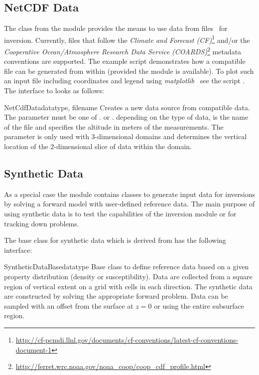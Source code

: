 \subsection{NetCDF Data}
The  class from the  module
provides the means to use data from \netcdf files~\cite{netcdf} for inversion.
Currently, files that follow the \emph{Climate and Forecast (CF)}\footnote{%
\url{http://cf-pcmdi.llnl.gov/documents/cf-conventions/latest-cf-conventions-document-1}}
and/or the \emph{Cooperative Ocean/Atmosphere Research Data Service (COARDS)}\footnote{%
\url{http://ferret.wrc.noaa.gov/noaa_coop/coop_cdf_profile.html}} metadata
conventions are supported.
The example script  demonstrates how a compatible
file can be generated from within \python (provided the  module
is available).
To plot such an input file including coordinates and legend using
\emph{matplotlib}~\cite{matplotlib} see the script .
The interface to  looks as follows:

\begin{classdesc}{NetCdfData}{datatype, filename%
}
Creates a new data source from compatible \netcdf data.
The parameter  must be one of
. or .
depending on the type of data,  is the name of the file and
 specifies the altitude in meters of the measurements.
The  parameter is only used with 3-dimensional domains and
determines the vertical location of the 2-dimensional slice of data within the
domain.
\end{classdesc}

\subsection{Synthetic Data}
As a special case the  module contains
classes to generate input data for inversions by solving a forward model with
user-defined reference data.
The main purpose of using synthetic data is to test the capabilities of the
inversion module or for tracking down problems.

The base class for synthetic data which is derived from 
has the following interface:

\begin{classdesc}{SyntheticDataBase}{datatype%
}
Base class to define reference data based on a given property distribution
(density or susceptibility). Data are collected from a square region of
vertical extent  on a grid with 
cells in each direction.
The synthetic data are constructed by solving the appropriate forward problem.
Data can be sampled with an offset from the surface at $z=0$ or using the
entire subsurface region.
\end{classdesc}

